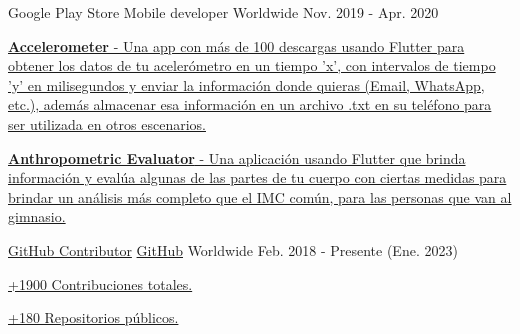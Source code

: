\begin{cventries}
  \cventry
    {Google Play Store} %
    {Mobile developer} %
    {Worldwide} %
    {Nov. 2019 - Apr. 2020} %
    {
      \begin{cvitems} %
        \item {\href{https://play.google.com/store/apps/details?id=com.grisu.accelerometer}{
        \textbf{Accelerometer} - Una app con más de 100 descargas usando Flutter para obtener los datos de tu acelerómetro en un tiempo 'x', con intervalos de tiempo 'y' en milisegundos y enviar la información donde quieras (Email, WhatsApp, etc.), además almacenar esa información en un archivo .txt en su teléfono para ser utilizada en otros escenarios.}}
        \item {\href{https://play.google.com/store/apps/details?id=com.grisu.anthropometric_evaluator}{
          \textbf{Anthropometric Evaluator} - Una aplicación usando Flutter que brinda información y evalúa algunas de las partes de tu cuerpo con ciertas medidas para brindar un análisis más completo que el IMC común, para las personas que van al gimnasio.}}
      \end{cvitems}
    }

  \cventry
    {\href{https://github.com/Youngermaster}{GitHub Contributor}} %
    {\href{https://github.com/Youngermaster}{GitHub}} %
    {Worldwide} %
    {Feb. 2018 - Presente (Ene. 2023)} %
    {
      \begin{cvitems} %
        \item {\href{https://github.com/Youngermaster}{+1900 Contribuciones totales.}}
        \item {\href{https://github.com/Youngermaster}{+180 Repositorios públicos.}}
      \end{cvitems}
    }

\end{cventries}
